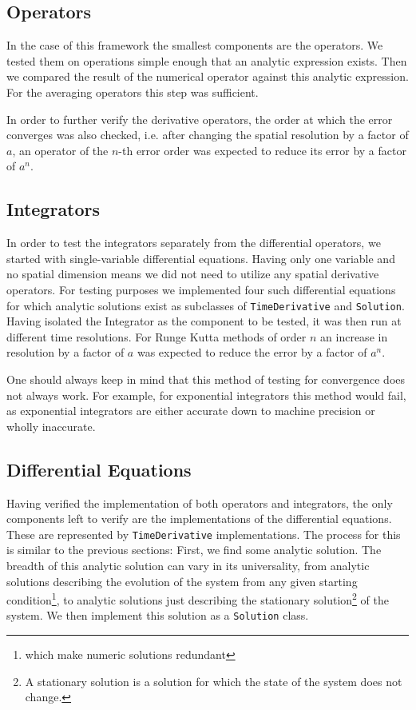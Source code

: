 \subsection{Operators}
In the case of this framework the smallest components are the operators.
We tested them on operations simple enough that an analytic expression exists.
Then we compared the result of the numerical operator against this analytic expression.
For the averaging operators this step was sufficient.

In order to further verify the derivative operators, the order at which the error converges was also checked, i.e. after changing the spatial resolution by a factor of $a$, an operator of the $n$-th error order was expected to reduce its error by a factor of $a^n$.

\subsection{Integrators}
In order to test the integrators separately from the differential operators, we started with single-variable differential equations.
Having only one variable and no spatial dimension means we did not need to utilize any spatial derivative operators.
For testing purposes we implemented four such differential equations for which analytic solutions exist as subclasses of \texttt{TimeDerivative} and \texttt{Solution}.
Having isolated the Integrator as the component to be tested, it was then run at different time resolutions.
For Runge Kutta methods of order $n$ an increase in resolution by a factor of $a$ was expected to reduce the error by a factor of $a^n$.

One should always keep in mind that this method of testing for convergence does not always work.
For example, for exponential integrators this method would fail, as exponential integrators are either accurate down to machine precision or wholly inaccurate.

\subsection{Differential Equations}
Having verified the implementation of both operators and integrators, the only components left to verify are the implementations of the differential equations.
These are represented by \texttt{TimeDerivative} implementations.
The process for this is similar to the previous sections: First, we find some analytic solution.
The breadth of this analytic solution can vary in its universality, from analytic solutions describing the evolution of the system from any given starting condition\footnote{which make numeric solutions redundant}, to analytic solutions just describing the stationary solution\footnote{A stationary solution is a solution for which the state of the system does not change.} of the system.
We then implement this solution as a \texttt{Solution} class.

